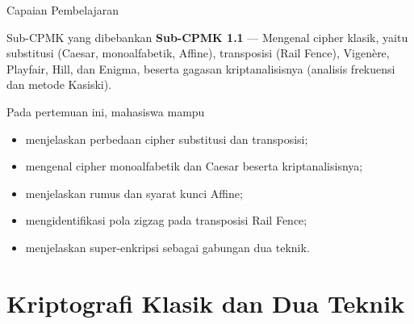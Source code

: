 \documentclass[aspectratio=169,11pt]{beamer}
\begin{document}
\begin{frame}{Capaian Pembelajaran}
    \begin{block}{Sub-CPMK yang dibebankan}
        \footnotesize
        \textbf{Sub-CPMK 1.1} --- Mengenal cipher klasik, yaitu substitusi
        (Caesar, monoalfabetik, Affine), transposisi (Rail Fence),
        Vigen\`{e}re, Playfair, Hill, dan Enigma, beserta gagasan
        kriptanalisisnya (analisis frekuensi dan metode Kasiski).
    \end{block}
    \vspace{0.15cm}
    \begin{exampleblock}{Pada pertemuan ini, mahasiswa mampu}
        \begin{itemize}
            \item menjelaskan perbedaan cipher substitusi dan transposisi;
            \item mengenal cipher monoalfabetik dan Caesar beserta
                  kriptanalisisnya;
            \item menjelaskan rumus dan syarat kunci Affine;
            \item mengidentifikasi pola zigzag pada transposisi Rail Fence;
            \item menjelaskan super-enkripsi sebagai gabungan dua teknik.
        \end{itemize}
    \end{exampleblock}
\end{frame}

\section{Kriptografi Klasik dan Dua Teknik}
\end{document}
